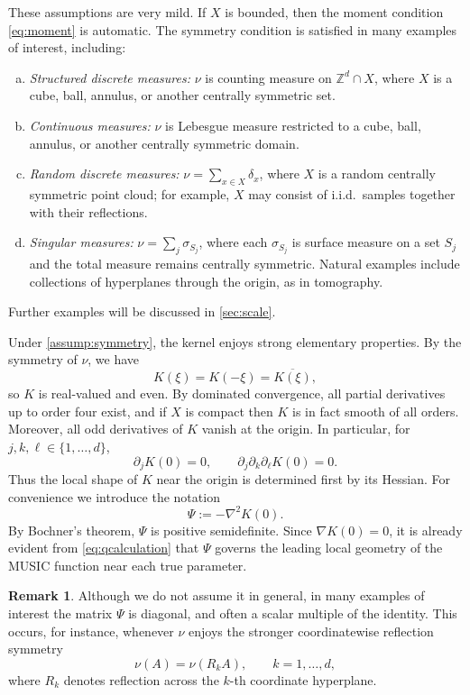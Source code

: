 \documentclass[11pt]{article}
\theoremstyle{definition}
\newtheorem{remark}{Remark}[section]
\numberwithin{theorem}{section}
\numberwithin{lemma}{section}
\numberwithin{equation}{section}
\def\Z{\mathbb{Z}}
\numberwithin{equation}{section}
\begin{document}
These assumptions are very mild. If $X$ is bounded, then the moment condition \eqref{eq:moment} is automatic. The symmetry condition is satisfied in many examples of interest, including:
\begin{enumerate}[(a)]
\item \emph{Structured discrete measures:} $\nu$ is counting measure on $\Z^d\cap X$, where $X$ is a cube, ball, annulus, or another centrally symmetric set.
\item \emph{Continuous measures:} $\nu$ is Lebesgue measure restricted to a cube, ball, annulus, or another centrally symmetric domain.
\item \emph{Random discrete measures:} $\nu=\sum_{x\in X}\delta_x$, where $X$ is a random centrally symmetric point cloud; for example, $X$ may consist of i.i.d.\ samples together with their reflections.
\item \emph{Singular measures:} $\nu=\sum_j \sigma_{S_j}$, where each $\sigma_{S_j}$ is surface measure on a set $S_j$ and the total measure remains centrally symmetric. Natural examples include collections of hyperplanes through the origin, as in tomography.
\end{enumerate}
Further examples will be discussed in \cref{sec:scale}.

Under \cref{assump:symmetry}, the kernel enjoys strong elementary properties. By the symmetry of $\nu$, we have
\[
K(\xi)=K(-\xi)=\overline{K(\xi)},
\]
so $K$ is real-valued and even. By dominated convergence, all partial derivatives up to order four exist, and if $X$ is compact then $K$ is in fact smooth of all orders. Moreover, all odd derivatives of $K$ vanish at the origin. In particular, for $j,k,\ell\in\{1,\dots,d\}$,
\begin{equation}
\label{eq:Kzeroformulas}
\partial_j K(0)=0,
\qquad
\partial_j\partial_k\partial_\ell K(0)=0.
\end{equation}
Thus the local shape of $K$ near the origin is determined first by its Hessian. For convenience we introduce the notation
\begin{equation}
\label{eq:hessiandef}
\Psi:=-\nabla^2 K(0).
\end{equation}
By Bochner's theorem, $\Psi$ is positive semidefinite. Since $\nabla K(0)=0$, it is already evident from \eqref{eq:qcalculation} that $\Psi$ governs the leading local geometry of the MUSIC function near each true parameter.

\begin{remark}
Although we do not assume it in general, in many examples of interest the matrix $\Psi$ is diagonal, and often a scalar multiple of the identity. This occurs, for instance, whenever $\nu$ enjoys the stronger coordinatewise reflection symmetry
\[
\nu(A)=\nu(R_kA),
\qquad k=1,\dots,d,
\]
where $R_k$ denotes reflection across the $k$-th coordinate hyperplane.
\end{remark}
\end{document}
